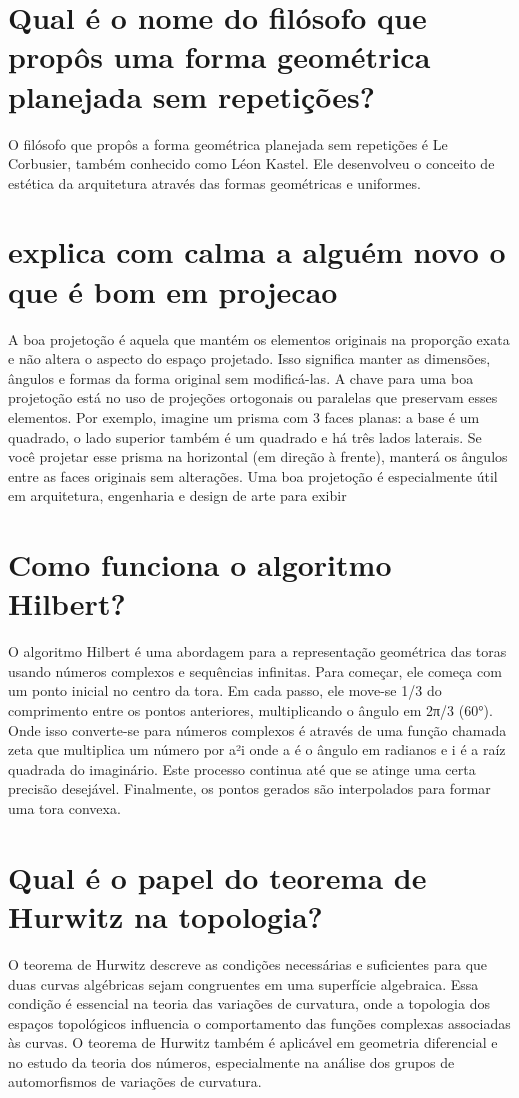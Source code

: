 \documentclass[11pt,a4paper]{article}
\begin{document}
\section{Qual é o nome do filósofo que propôs uma forma geométrica planejada sem repetições?}
O filósofo que propôs a forma geométrica planejada sem repetições é Le Corbusier, também conhecido como Léon Kastel. Ele desenvolveu o conceito de estética da arquitetura através das formas geométricas e uniformes.

\section{explica com calma a alguém novo o que é bom em projecao}
A boa projetoção é aquela que mantém os elementos originais na proporção exata e não altera o aspecto do espaço projetado. Isso significa manter as dimensões, ângulos e formas da forma original sem modificá-las. A chave para uma boa projetoção está no uso de projeções ortogonais ou paralelas que preservam esses elementos. Por exemplo, imagine um prisma com 3 faces planas: a base é um quadrado, o lado superior também é um quadrado e há três lados laterais. Se você projetar esse prisma na horizontal (em direção à frente), manterá os ângulos entre as faces originais sem alterações. Uma boa projetoção é especialmente útil em arquitetura, engenharia e design de arte para exibir

\section{Como funciona o algoritmo Hilbert?}
O algoritmo Hilbert é uma abordagem para a representação geométrica das toras usando números complexos e sequências infinitas. Para começar, ele começa com um ponto inicial no centro da tora. Em cada passo, ele move-se 1/3 do comprimento entre os pontos anteriores, multiplicando o ângulo em 2π/3 (60°). Onde isso converte-se para números complexos é através de uma função chamada zeta que multiplica um número por a²i onde a é o ângulo em radianos e i é a raíz quadrada do imaginário. Este processo continua até que se atinge uma certa precisão desejável. Finalmente, os pontos gerados são interpolados para formar uma tora convexa.

\section{Qual é o papel do teorema de Hurwitz na topologia?}
O teorema de Hurwitz descreve as condições necessárias e suficientes para que duas curvas algébricas sejam congruentes em uma superfície algebraica. Essa condição é essencial na teoria das variações de curvatura, onde a topologia dos espaços topológicos influencia o comportamento das funções complexas associadas às curvas. O teorema de Hurwitz também é aplicável em geometria diferencial e no estudo da teoria dos números, especialmente na análise dos grupos de automorfismos de variações de curvatura.
\end{document}
